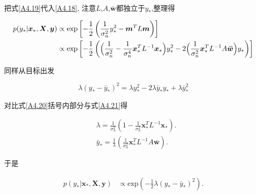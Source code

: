         把式\ref{A4.19}代入\ref{A4.18}, 注意$L$,$A$,$\boldsymbol{\bar{w}}$都独立于$y_{*}$,整理得

        \begin{equation}
            \begin{aligned} \label{A4.20}
                p(y_{*}|\boldsymbol{x}_{*},\boldsymbol{X},\boldsymbol{y})
                &\propto\mathrm{exp}\left[ -\frac{1}{2}\left(\frac{1}{\sigma^{2}_{n}}y^{2}_{*} - \boldsymbol{m}^{T}L\boldsymbol{m}\right) \right]\\
                &\propto\mathrm{exp}\left[ -\frac{1}{2}\left( \Bigl(\frac{1}{\sigma^{2}_{n}}-\frac{1}{\sigma^{4}_{n}}\boldsymbol{x}^{T}_{*}L^{-1}\boldsymbol{x}_{*} \Bigl)y^{2}_{*}-2\Bigl(\frac{1}{\sigma^{2}_{n}}\boldsymbol{x}^{T}_{*}L^{-1}A\boldsymbol{\bar{w}} \Bigl)y_{*} \right) \right] \\
            \end{aligned}
        \end{equation}

        同样从目标出发

        \begin{equation} \label{A4.21}
            \lambda(y_{*}-\bar{y}_{*})^{2}=\lambda y^{2}_{*}-2\lambda \bar{y}_{*}y_{*}+\lambda \bar{y}^{2}_{*}
        \end{equation}

        对比式\ref{A4.20}括号内部分与式\ref{A4.21}得

            \begin{align} 
                &\lambda =\frac{1}{\sigma^{2}_{n}}(1-\frac{1}{\sigma^{2}_{n}}\boldsymbol{x}^{T}_{*}L^{-1}\boldsymbol{x}_{*}). \label{A4.22}\\
                &\bar{y}_{*}=\frac{1}{\lambda}(\frac{1}{\sigma^{2}_{n}}\boldsymbol{x}^{T}_{*}L^{-1}A\boldsymbol{\bar{w}}). \label{A4.23}
            \end{align}

            于是

            \begin{equation}
                \begin{aligned} \label{A4.24}
                    p(y_{*}|\boldsymbol{x}_{*},\boldsymbol{X},\boldsymbol{y})
                    &\propto\mathrm{exp}\left( -\frac{1}{2}\lambda (y_{*} - \bar{y}_{*})^{2} \right).\\
                \end{aligned}
            \end{equation}

